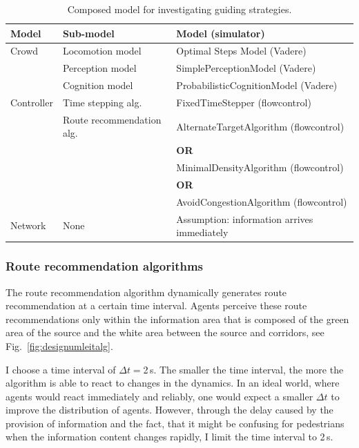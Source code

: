 \begin{table}[hbt!]
\begin{footnotesize}
\begin{tabular}{p{2cm}p{4cm}p{7cm}}
\hline
Model & Sub-model & Model (simulator) \\ \hline
Crowd  & Locomotion model & Optimal Steps Model (Vadere) \\
& Perception model &  SimplePerceptionModel (Vadere) \\
& Cognition model & ProbabilisticCognitionModel (Vadere) \\
Controller &
Time stepping alg. & FixedTimeStepper  (flowcontrol) \\
&  Route recommendation alg. & AlternateTargetAlgorithm  (flowcontrol) \\
&& \textbf{OR} \\
 && MinimalDensityAlgorithm    (flowcontrol) \\
 && \textbf{OR} \\
 &&  AvoidCongestionAlgorithm (flowcontrol) \\
Network & None & Assumption: information arrives immediately   \\ \hline
\end{tabular} 
\end{footnotesize}
\caption[Composed model for investigating guiding strategies]{Composed model for investigating guiding strategies. }
\label{fig:composedmodelrq-2}
\end{table}

\subsubsection{Route recommendation algorithms}
The route recommendation algorithm dynamically generates route recommendation at a certain time interval. Agents perceive these route recommendations only within the information area that is composed of the green area
of the source and the white area between the source and corridors, see Fig.~\ref{fig:designumleitalg}. 

I choose a time interval of $\Delta t=$2\,s. The smaller the time interval, the more the algorithm is able to react to changes in the dynamics. In an ideal world, where agents would react immediately and reliably, one would expect a smaller $\Delta t$ to improve the distribution of agents. However, through the delay caused by the provision of information and the fact, that it might be confusing for pedestrians when the information content changes rapidly, I limit the time interval to 2\,s.


